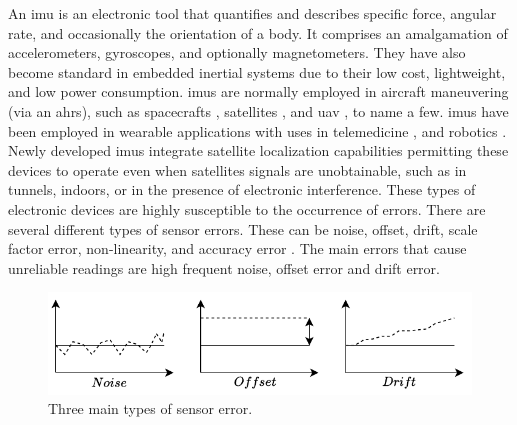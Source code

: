 An \acrfull{imu} is an electronic tool that quantifies and describes specific force, angular rate, and occasionally the orientation of a body. It comprises an amalgamation of accelerometers, gyroscopes, and optionally magnetometers. They have also become standard in embedded inertial systems due to their low cost, lightweight, and low power consumption. \acrshort{imu}s are normally employed in aircraft maneuvering (via an \acrlong{ahrs}), such as spacecrafts \cite{li2011calibration} \cite{haberberger2016imu} \cite{faragher2012understanding}, satellites \cite{lu2020orbit}, and \acrfull{uav} \cite{sahawneh2008development} \cite{eling2015real}, to name a few. \acrshort{imu}s have been employed in wearable applications with uses in  telemedicine \cite{madgwick2020extended} \cite{allen2013telemedicine} \cite{giansanti2009toward} \cite{o2021measuring}, and robotics \cite{wilson2019formulation}. Newly developed \acrshort{imu}s integrate satellite localization capabilities permitting these devices to operate even when satellites signals are unobtainable, such as in tunnels, indoors, or in the presence of electronic interference. These types of electronic devices are highly susceptible to the occurrence of errors. There are several different types of sensor errors. These can be noise, offset, drift, scale factor error, non-linearity, and accuracy error \cite{hanke2016classification}. The main errors that cause unreliable readings are high frequent noise, offset error and drift error.

\begin{figure}[!h]
    \centering
    \includegraphics[width=1\textwidth]{figures/noise.pdf}
    \caption{Three main types of sensor error.}
    \label{fig:noise}
\end{figure}


